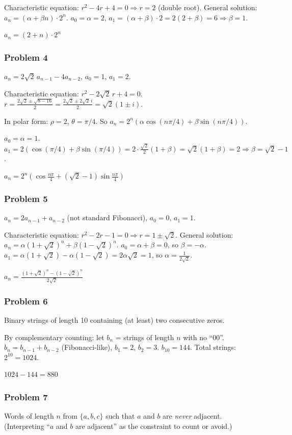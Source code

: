 Characteristic equation: $r^2-4r+4=0\Rightarrow r=2$ (double root).
General solution: $a_n=(\alpha+\beta n)\cdot 2^n$.
$a_0=\alpha=2$, $a_1=(\alpha+\beta)\cdot 2 = 2(2+\beta)=6 \Rightarrow \beta=1$.

$\boxed{a_n = (2+n)\cdot 2^n}$

\subsubsection*{Problem 4}
$a_n = 2\sqrt{2}\,a_{n-1}-4a_{n-2}$, $a_0=1$, $a_1=2$.

Characteristic equation: $r^2-2\sqrt{2}\,r+4=0$.
$r = \frac{2\sqrt{2}\pm\sqrt{8-16}}{2} = \frac{2\sqrt{2}\pm 2\sqrt{2}\,i}{2} = \sqrt{2}(1\pm i)$.

In polar form: $\rho=2$, $\theta=\pi/4$. So $a_n = 2^n(\alpha\cos(n\pi/4)+\beta\sin(n\pi/4))$.

$a_0 = \alpha = 1$. $a_1 = 2(\cos(\pi/4)+\beta\sin(\pi/4)) = 2\cdot\frac{\sqrt{2}}{2}(1+\beta) = \sqrt{2}(1+\beta)=2 \Rightarrow \beta = \sqrt{2}-1$.

$\boxed{a_n = 2^n\!\left(\cos\frac{n\pi}{4} + (\sqrt{2}-1)\sin\frac{n\pi}{4}\right)}$

\subsubsection*{Problem 5}
$a_n=2a_{n-1}+a_{n-2}$ (not standard Fibonacci), $a_0=0$, $a_1=1$.

Characteristic equation: $r^2-2r-1=0 \Rightarrow r=1\pm\sqrt{2}$.
General solution: $a_n=\alpha(1+\sqrt{2})^n+\beta(1-\sqrt{2})^n$.
$a_0=\alpha+\beta=0$, so $\beta=-\alpha$.
$a_1=\alpha(1+\sqrt{2})-\alpha(1-\sqrt{2})=2\alpha\sqrt{2}=1$, so $\alpha=\frac{1}{2\sqrt{2}}$.

$\boxed{a_n = \frac{(1+\sqrt{2})^n - (1-\sqrt{2})^n}{2\sqrt{2}}}$

\subsubsection*{Problem 6}
Binary strings of length 10 containing (at least) two consecutive zeros.

By complementary counting: let $b_n$ = strings of length $n$ with no ``00''.
$b_n = b_{n-1}+b_{n-2}$ (Fibonacci-like), $b_1=2$, $b_2=3$.
$b_{10}=144$. Total strings: $2^{10}=1024$.

$\boxed{1024-144=880}$

\subsubsection*{Problem 7}
Words of length $n$ from $\{a,b,c\}$ such that $a$ and $b$ are \emph{never} adjacent. (Interpreting ``$a$ and $b$ are adjacent'' as the constraint to count or avoid.)

